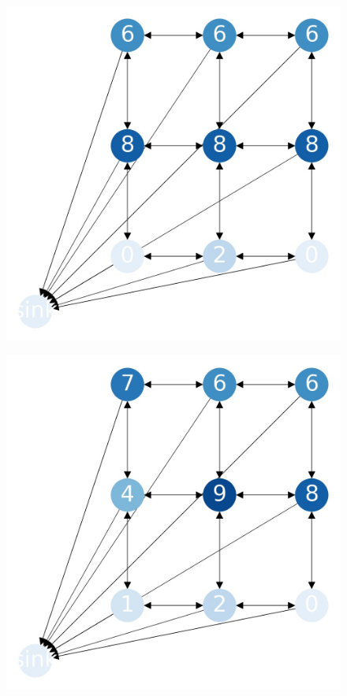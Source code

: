 \documentclass{beamer}
\begin{document}
\begin{frame}
  \begin{figure}[h!]
    \centering
      \includegraphics[scale=0.25]{sandpile_6}
  \end{figure}
\end{frame}


\begin{frame}
  \begin{figure}[h!]
    \centering
      \includegraphics[scale=0.25]{sandpile_7}
  \end{figure}
\end{frame}
\end{document}
